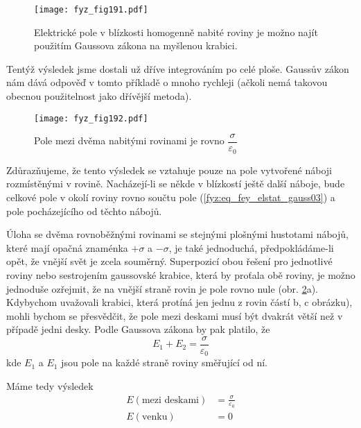   \begin{figure}[ht!] %
    \centering
    \texttt{[image: fyz\_fig191.pdf]}
    \caption{Elektrické pole v blízkosti homogenně nabité roviny je možno najít použitím   
             Gaussova zákona na myšlenou krabici.}
    \label{fyz:fig191}
  \end{figure}
  
  Tentýž výsledek jsme dostali už dříve integrováním po celé ploše. Gaussův zákon nám dává 
  odpověď v tomto příkladě o mnoho rychleji (ačkoli nemá takovou obecnou použitelnost jako 
  dřívější metoda).

  \begin{figure}[ht!]  %
    \centering
    \texttt{[image: fyz\_fig192.pdf]}
    \caption{Pole mezi dvěma nabitými rovinami je rovno \(\dfrac{\sigma}{\varepsilon_0}\)}
    \label{fyz:fig192}
  \end{figure}
  Zdůrazňujeme, že tento výsledek se vztahuje pouze na pole vytvořené náboji rozmístěnými v 
  rovině. Nacházejí-li se někde v blízkostí ještě další náboje, bude celkové pole v okolí 
  roviny rovno součtu pole (\ref{fyz:eq_fey_elstat_gauss03}) a pole pocházejícího od těchto 
  nábojů.
   
  Úloha se dvěma rovnoběžnými rovinami se stejnými plošnými hustotami nábojů, které mají opačná 
  znaménka \(+\sigma\) a \(-\sigma\), je také jednoduchá, předpokládáme-li opět, že vnější svět 
  je zcela souměrný. Superpozicí obou řešení pro jednotlivé roviny nebo sestrojením gaussovské 
  krabice, která by proťala obě roviny, je možno jednoduše ozřejmit, že na vnější straně rovin 
  je pole rovno nule (obr. \ref{fyz:fig192}a). Kdybychom uvažovali krabici, 
  která protíná jen jednu z rovin částí b, c obrázku), mohli bychom se přesvědčit, že pole mezi 
  deskami musí být dvakrát větší než v případě jedni desky. Podle Gaussova zákona by pak 
  platilo, že
  \begin{equation}\label{fyz:eq_fey_elstat_gauss04}
    E_1 + E_2 = \frac{\sigma}{\varepsilon_0}
  \end{equation}
  kde \(E_1\) a \(E_1\) jsou pole na každé straně roviny směřující od ní.

  Máme tedy výsledek
  \begin{align}
    E (\text{mezi deskami}) &= \frac{\sigma}{\varepsilon_0} \\
    E (\text{venku})        &= 0  
  \end{align}
  
